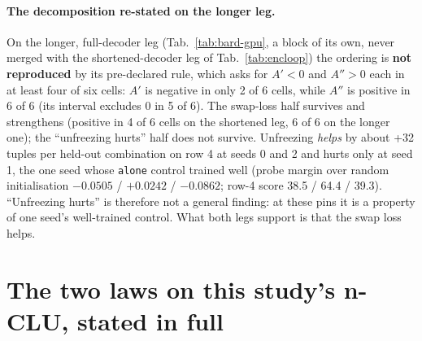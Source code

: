 \documentclass{article} %
\begin{document}
\paragraph{The decomposition re-stated on the longer leg.} On the
longer, full-decoder leg (Tab.~\ref{tab:bard-gpu}, a block of its own, never merged with the
shortened-decoder leg of Tab.~\ref{tab:encloop}) the ordering is \textbf{not reproduced} by its
pre-declared rule, which asks for $A'<0$ and $A''>0$ each in at least four of six cells: $A'$ is
negative in only 2 of 6 cells, while $A''$ is positive in 6 of 6 (its interval excludes 0 in 5 of %
6). The swap-loss half survives and strengthens (positive in 4 of 6 cells on the shortened leg, 6 %
of 6 on the longer one); the ``unfreezing hurts'' half does not survive. Unfreezing \emph{helps} by
about +32 tuples per held-out combination on row 4 at seeds 0 and 2 and hurts only at seed 1, the one seed whose %
\texttt{alone} control trained well (probe margin over random initialisation $-0.0505$ / %
$+0.0242$ / $-0.0862$; row-4 score 38.5 / 64.4 / 39.3). ``Unfreezing hurts'' is therefore not a %
general finding: at these pins it is a property of one seed's well-trained control. What both legs
support is that the swap loss helps.

\section{The two laws on this study's n-CLU, stated in full}
\label{app:laws}
\end{document}
